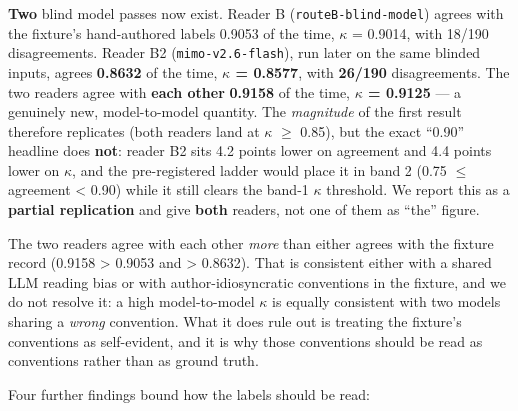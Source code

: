 \documentclass[10pt]{article}
\begin{document}
\textbf{Two} blind model passes now exist. Reader B (\texttt{routeB-blind-model}) agrees with the fixture's hand-authored labels 0.9053 of the time, $\kappa$ = 0.9014, with 18/190 disagreements. Reader B2 (\texttt{mimo-v2.6-flash}), run later on the same blinded inputs, agrees \textbf{0.8632} of the time, \textbf{$\kappa$ = 0.8577}, with \textbf{26/190} disagreements. The two readers agree with \textbf{each other} \textbf{0.9158} of the time, \textbf{$\kappa$ = 0.9125} --- a genuinely new, model-to-model quantity. The \emph{magnitude} of the first result therefore replicates (both readers land at $\kappa$ $\ge$ 0.85), but the exact ``0.90'' headline does \textbf{not}: reader B2 sits 4.2 points lower on agreement and 4.4 points lower on $\kappa$, and the pre-registered ladder would place it in band 2 (0.75 $\le$ agreement < 0.90) while it still clears the band-1 $\kappa$ threshold. We report this as a \textbf{partial replication} and give \textbf{both} readers, not one of them as ``the'' figure.

The two readers agree with each other \emph{more} than either agrees with the fixture record (0.9158 > 0.9053 and > 0.8632). That is consistent either with a shared LLM reading bias or with author-idiosyncratic conventions in the fixture, and we do not resolve it: a high model-to-model $\kappa$ is equally consistent with two models sharing a \emph{wrong} convention. What it does rule out is treating the fixture's conventions as self-evident, and it is why those conventions should be read as conventions rather than as ground truth.

Four further findings bound how the labels should be read:
\end{document}

